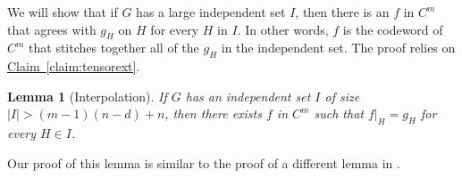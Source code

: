 \documentclass[11pt]{article}
\numberwithin{equation}{section}
\newtheorem{lemma}[theorem]{Lemma}
\theoremstyle{definition}
\theoremstyle{plain}
\newcommand{\expref}[2]{\hyperref[#2]{#1~\ref{#2}}}
\theoremstyle{plain}
\newcommand{\colored}{}
\newcommand{\plane}{{\colored{H}}} %
\newcommand{\codedist}{\colored{d}} %
\newcommand{\blocklength}{\colored{n}} %
\newcommand{\closestlocalword}[1]{ \colored{g_{#1}}} %
\newcommand{\closestglobalword}{\colored{f}} %
\newcommand\abs[1]{\colored{\left|#1\right|}}
\begin{document}
We will show that if $G$ has a large independent set $I$, then there is an $\closestglobalword$ in $C^m$ that agrees with $\closestlocalword{\plane}$ on $\plane$ for every $\plane$ in $I$. In other words, $\closestglobalword$ is the codeword of $C^m$ that stitches together all of the
%
$\closestlocalword{\plane}$      %
in the independent set. The proof relies on \expref{Claim}{claim:tensorext}.
\begin{lemma}[Interpolation]\label{lemma:interp}
If $G$ has an independent set $I$ of size $\abs{I} > (m-1)(\blocklength-\codedist) + \blocklength$, then there exists $\closestglobalword$ in $C^m$ such that $\closestglobalword \vert_{\plane} = \closestlocalword{\plane}$ for every $\plane \in I$.
\end{lemma}
\noindent
Our proof of this lemma is similar to the proof of a different lemma in \cite{Ben-SassonS06}.
\end{document}
